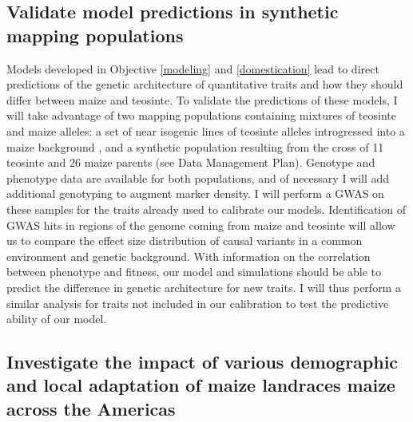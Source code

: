 
\subsection{Validate model predictions in synthetic mapping populations}
\label{validation}

Models developed in Objective \ref{modeling} and \ref{domestication} lead to direct predictions of the genetic architecture of quantitative traits and how they should differ between maize and teosinte. To validate the predictions of these models, I will take advantage of two mapping populations containing mixtures of teosinte and maize alleles: a set of near isogenic lines of teosinte alleles introgressed into a maize background \citep{Liu:InPress}, and a synthetic population resulting from the cross of 11 teosinte and 26 maize parents (see Data Management Plan). Genotype and phenotype data are available for both populations, and of necessary I will add additional genotyping to augment marker density.
I will perform a GWAS on these samples for the traits already used to calibrate our models. Identification of GWAS hits in regions of the genome coming from maize and teosinte will allow us to compare the effect size distribution of causal variants in a common environment and genetic background. With information on the correlation between phenotype and fitness, our model and simulations should be able to predict the difference in genetic architecture for new traits. I will thus perform a similar analysis for traits not included in our calibration to test the predictive ability of our model. 

\subsection{Investigate the impact of various demographic and local adaptation of maize landraces maize across the Americas} 
\label{surfing}

